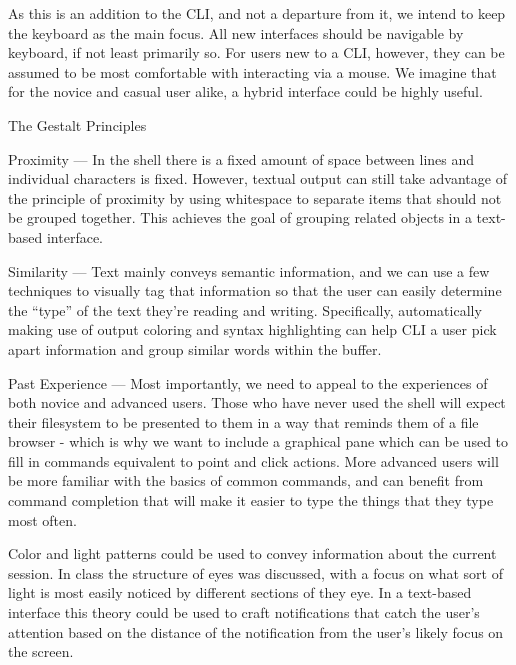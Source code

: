 As this is an addition to the CLI, and not a departure from it, we intend to
keep the keyboard as the main focus. All new interfaces should be navigable by
keyboard, if not least primarily so. For users new to a CLI, however, they can
be assumed to be most comfortable with interacting via a mouse. We imagine that
for the novice and casual user alike, a hybrid interface could be highly useful.

The Gestalt Principles

Proximity --- In the shell there is a fixed amount of space between lines and
individual characters is fixed. However, textual output can still take advantage
of the principle of proximity by using whitespace to separate items that should
not be grouped together. This achieves the goal of grouping related objects in a
text-based interface.

Similarity --- Text mainly conveys semantic information, and we can use a few
techniques to visually tag that information so that the user can easily
determine the “type” of the text they’re reading and writing. Specifically,
automatically making use of output coloring and syntax highlighting can help CLI
a user pick apart information and group similar words within the buffer.

Past Experience --- Most importantly, we need to appeal to the experiences of both
novice and advanced users. Those who have never used the shell will expect their
filesystem to be presented to them in a way that reminds them of a file browser
- which is why we want to include a graphical pane which can be used to fill in
commands equivalent to point and click actions. More advanced users will be more
familiar with the basics of common commands, and can benefit from command
completion that will make it easier to type the things that they type most
often.

Color and light patterns could be used to convey information about the current
session. In class the structure of eyes was discussed, with a focus on what sort
of light is most easily noticed by different sections of they eye. In a
text-based interface this theory could be used to craft notifications that catch
the user’s attention based on the distance of the notification from the user’s
likely focus on the screen.

